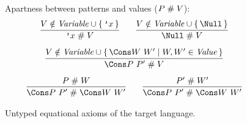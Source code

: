 \documentclass[runningheads]{llncs}
\begin{document}
\begin{figure}

Apartness between patterns and values ($P \mathrel{\#} V$):
\begin{gather*}
  \infer
  {\q{x} \apart V}
  {V \notin \mathit{Variable} \cup \set{\q{x}}}
  \qquad
  \infer
  {\Null \apart V}
  {V \notin \mathit{Variable} \cup \set{\Null}}
  \\[1ex]
  \infer
  {\Cons P ~ P' \apart V}
  {V \notin \mathit{Variable} \cup \set{\Cons W ~ W' \mid W, W' \in \mathit{Value}}}
  \\[1ex]
  \infer
  {\Cons P ~ P' \apart \Cons W ~ W'}
  {P \apart W}
  \qquad
  \infer
  {\Cons P ~ P' \apart \Cons W ~ W'}
  {P' \apart W'}
\end{gather*}

\caption{Untyped equational axioms of the target language.}
\label{fig:target-equality}
\end{figure}
\end{document}
